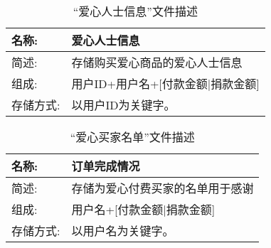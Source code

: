 
\begin{table}[H]  
\caption{``爱心人士信息”文件描述}  
\begin{center}  
    \begin{tabular}{l p{11cm}} 
        \hline
        \quad 名称:  &   爱心人士信息 \\
        \hline
        \quad 简述:  & 存储购买爱心商品的爱心人士信息\\
        \hline
        \quad 组成:  & 用户ID+用户名+[付款金额|捐款金额] \\
        \hline
        \quad 存储方式:  & 以用户ID为关键字。 \\
        \hline
    \end{tabular}
    \label{tab1}
\end{center}
\end{table}

\begin{table}[H]  
\caption{``爱心买家名单”文件描述}  
\begin{center}  
    \begin{tabular}{l p{11cm}} 
        \hline
        \quad 名称:  &   订单完成情况 \\
        \hline
        \quad 简述:  & 存储为爱心付费买家的名单用于感谢\\
        \hline
        \quad 组成:  & 用户名+[付款金额|捐款金额] \\
        \hline
        \quad 存储方式:  & 以用户名为关键字。 \\
        \hline
    \end{tabular}
    \label{tab1}
\end{center}
\end{table}